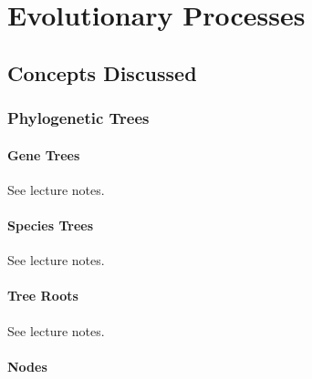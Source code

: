 
\chapter{Evolutionary Processes} 

\label{Chapter5}

\section{Concepts Discussed}

    \subsection{Phylogenetic Trees}
        \subsubsection{Gene Trees}

        See lecture notes.\autocite{T5}

        \subsubsection{Species Trees}

        See lecture notes.\autocite{T5}

        \subsubsection{Tree Roots}

        See lecture notes.\autocite{T5}
        \subsubsection{Nodes}

